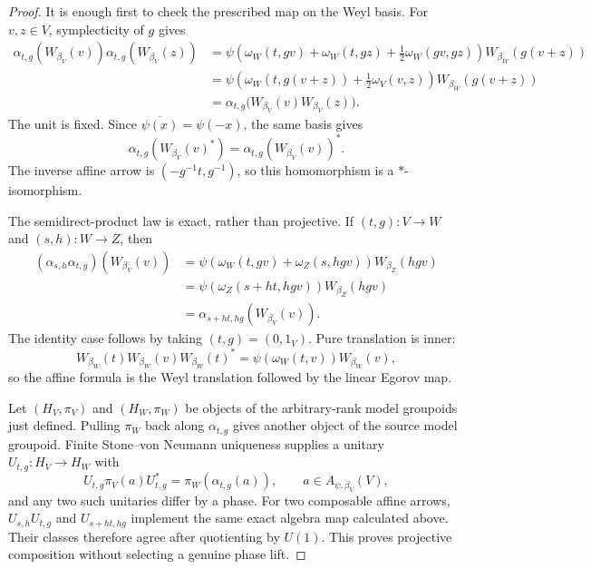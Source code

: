 \begin{proof}
It is enough first to check the prescribed map on the Weyl basis.  For
$v,z\in V$, symplecticity of $g$ gives
\begin{align*}
 \alpha_{t,g}(W_{\beta_V}(v))\alpha_{t,g}(W_{\beta_V}(z))
 &=\psi\!\left(
      \omega_W(t,gv)+\omega_W(t,gz)+\frac12\omega_W(gv,gz)
    \right)W_{\beta_W}(g(v+z)) \\
 &=\psi\!\left(
      \omega_W(t,g(v+z))+\frac12\omega_V(v,z)
    \right)W_{\beta_W}(g(v+z)) \\
 &=\alpha_{t,g}
   \bigl(W_{\beta_V}(v)W_{\beta_V}(z)\bigr).
\end{align*}
The unit is fixed. Since $\overline{\psi(x)}=\psi(-x)$, the same basis gives
\[
 \alpha_{t,g}(W_{\beta_V}(v)^*)=
 \alpha_{t,g}(W_{\beta_V}(v))^*.
\]
The inverse affine arrow is
$(-g^{-1}t,g^{-1})$, so this homomorphism is a $*$-isomorphism.

The semidirect-product law is exact, rather than projective.  If
$(t,g):V\to W$ and $(s,h):W\to Z$, then
\begin{align*}
 (\alpha_{s,h}\alpha_{t,g})(W_{\beta_V}(v))
 &=\psi\!\left(\omega_W(t,gv)+\omega_Z(s,hgv)\right)
   W_{\beta_Z}(hgv) \\
 &=\psi\!\left(\omega_Z(s+ht,hgv)\right)W_{\beta_Z}(hgv) \\
 &=\alpha_{s+ht,hg}(W_{\beta_V}(v)).
\end{align*}
The identity case follows by taking $(t,g)=(0,1_V)$.  Pure translation is
inner:
\[
 W_{\beta_W}(t)W_{\beta_W}(v)W_{\beta_W}(t)^*
 =\psi(\omega_W(t,v))W_{\beta_W}(v),
\]
so the affine formula is the Weyl translation followed by the linear
Egorov map.

Let $(H_V,\pi_V)$ and $(H_W,\pi_W)$ be objects of the arbitrary-rank model
groupoids just defined.  Pulling $\pi_W$ back along $\alpha_{t,g}$ gives
another object of the source model groupoid.  Finite Stone--von Neumann
uniqueness supplies a unitary
$U_{t,g}:H_V\to H_W$ with
\[
 U_{t,g}\pi_V(a)U_{t,g}^*=\pi_W(\alpha_{t,g}(a)),
 \qquad a\in A_{\psi,\beta_V}(V),
\]
and any two such unitaries differ by a phase.  For two composable affine
arrows, $U_{s,h}U_{t,g}$ and $U_{s+ht,hg}$ implement the same exact algebra
map calculated above.  Their classes therefore agree after quotienting by
$U(1)$.  This proves projective composition without selecting a genuine
phase lift.
\end{proof}

